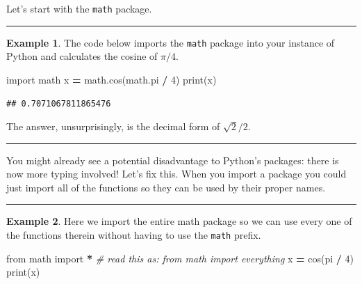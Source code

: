 \documentclass[
]{book}
\newenvironment{Shaded}{\begin{snugshade}}{\end{snugshade}}
\newcommand{\BuiltInTok}[1]{#1}
\newcommand{\CommentTok}[1]{\textcolor[rgb]{0.56,0.35,0.01}{\textit{#1}}}
\newcommand{\DecValTok}[1]{\textcolor[rgb]{0.00,0.00,0.81}{#1}}
\newcommand{\ImportTok}[1]{#1}
\newcommand{\NormalTok}[1]{#1}
\newcommand{\OperatorTok}[1]{\textcolor[rgb]{0.81,0.36,0.00}{\textbf{#1}}}
\theoremstyle{definition}
\theoremstyle{definition}
\newtheorem{example}{Example}[chapter]
\theoremstyle{definition}
\theoremstyle{remark}
\begin{document}
Let's start with the \texttt{math} package.

\begin{center}\rule{0.5\linewidth}{0.5pt}\end{center}

\begin{example}
\protect\hypertarget{exm:unnamed-chunk-699}{}{\label{exm:unnamed-chunk-699} }The code below imports the \texttt{math} package into your instance of Python
and calculates the cosine of \(\pi/4\).
\end{example}

\begin{Shaded}
\begin{Highlighting}[]
\ImportTok{import}\NormalTok{ math}
\NormalTok{x }\OperatorTok{=}\NormalTok{ math.cos(math.pi }\OperatorTok{/} \DecValTok{4}\NormalTok{)}
\BuiltInTok{print}\NormalTok{(x)}
\end{Highlighting}
\end{Shaded}

\begin{verbatim}
## 0.7071067811865476
\end{verbatim}

The answer, unsurprisingly, is the decimal form of \(\sqrt{2}/2\).

\begin{center}\rule{0.5\linewidth}{0.5pt}\end{center}

You might already see a potential disadvantage to Python's packages: there is now more typing involved! Let's fix this. When you import a package you could just import all of the functions so they can be used by their proper names.

\begin{center}\rule{0.5\linewidth}{0.5pt}\end{center}

\begin{example}
\protect\hypertarget{exm:unnamed-chunk-701}{}{\label{exm:unnamed-chunk-701} }Here we import the entire math package so we can use every one of the functions therein without having to use the \texttt{math} prefix.
\end{example}

\begin{Shaded}
\begin{Highlighting}[]
\ImportTok{from}\NormalTok{ math }\ImportTok{import} \OperatorTok{*} \CommentTok{\# read this as: from math import everything}
\NormalTok{x }\OperatorTok{=}\NormalTok{ cos(pi }\OperatorTok{/} \DecValTok{4}\NormalTok{)}
\BuiltInTok{print}\NormalTok{(x)}
\end{Highlighting}
\end{Shaded}
\end{document}
